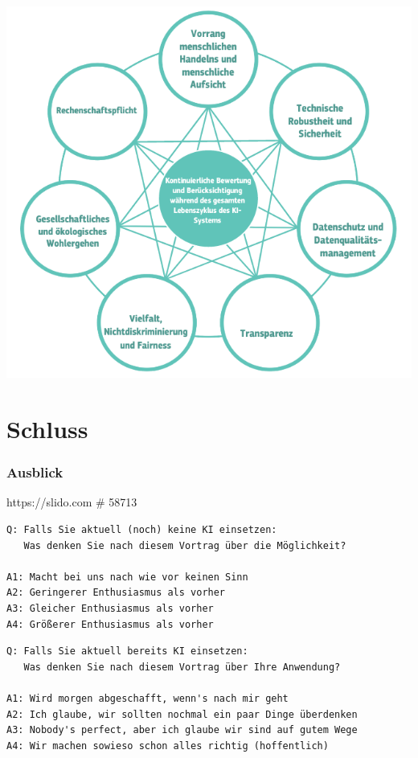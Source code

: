 \documentclass[aspectratio=169,xcolor=dvipsnames]{beamer}
\begin{document}
\begin{frame}
\begin{center}
\includegraphics[height=0.75\paperheight,keepaspectratio]{images/eu_prinzipien} 
\end{center}
\end{frame}

\section{Schluss}

\begin{frame}[fragile]
\frametitle{Ausblick}
\begin{center}
\large https://slido.com \qquad \# 58713
\end{center}

\scriptsize
\begin{minipage}{\textwidth}
\begin{verbatim}
Q: Falls Sie aktuell (noch) keine KI einsetzen:
   Was denken Sie nach diesem Vortrag über die Möglichkeit?

A1: Macht bei uns nach wie vor keinen Sinn
A2: Geringerer Enthusiasmus als vorher
A3: Gleicher Enthusiasmus als vorher
A4: Größerer Enthusiasmus als vorher
\end{verbatim}
\end{minipage}
\pause\bigskip\bigskip

\begin{minipage}{\textwidth}
\begin{verbatim}
Q: Falls Sie aktuell bereits KI einsetzen:
   Was denken Sie nach diesem Vortrag über Ihre Anwendung?

A1: Wird morgen abgeschafft, wenn's nach mir geht
A2: Ich glaube, wir sollten nochmal ein paar Dinge überdenken
A3: Nobody's perfect, aber ich glaube wir sind auf gutem Wege
A4: Wir machen sowieso schon alles richtig (hoffentlich) 
\end{verbatim}
\end{minipage}
\end{frame}
\end{document}

